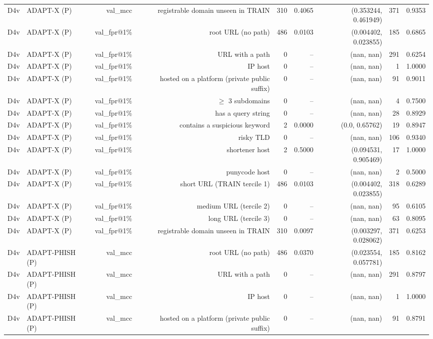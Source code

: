 \begin{table}[t]
\begin{tabular}{llrrrrrrr}
D4v & ADAPT-X (P) & val\_mcc & registrable domain unseen in TRAIN & 310 & 0.4065 & (0.353244, 0.461949) & 371 & 0.9353 \\
D4v & ADAPT-X (P) & val\_fpr@1\% & root URL (no path) & 486 & 0.0103 & (0.004402, 0.023855) & 185 & 0.6865 \\
D4v & ADAPT-X (P) & val\_fpr@1\% & URL with a path & 0 & -- & (nan, nan) & 291 & 0.6254 \\
D4v & ADAPT-X (P) & val\_fpr@1\% & IP host & 0 & -- & (nan, nan) & 1 & 1.0000 \\
D4v & ADAPT-X (P) & val\_fpr@1\% & hosted on a platform (private public suffix) & 0 & -- & (nan, nan) & 91 & 0.9011 \\
D4v & ADAPT-X (P) & val\_fpr@1\% & $\geq$ 3 subdomains & 0 & -- & (nan, nan) & 4 & 0.7500 \\
D4v & ADAPT-X (P) & val\_fpr@1\% & has a query string & 0 & -- & (nan, nan) & 28 & 0.8929 \\
D4v & ADAPT-X (P) & val\_fpr@1\% & contains a suspicious keyword & 2 & 0.0000 & (0.0, 0.65762) & 19 & 0.8947 \\
D4v & ADAPT-X (P) & val\_fpr@1\% & risky TLD & 0 & -- & (nan, nan) & 106 & 0.9340 \\
D4v & ADAPT-X (P) & val\_fpr@1\% & shortener host & 2 & 0.5000 & (0.094531, 0.905469) & 17 & 1.0000 \\
D4v & ADAPT-X (P) & val\_fpr@1\% & punycode host & 0 & -- & (nan, nan) & 2 & 0.5000 \\
D4v & ADAPT-X (P) & val\_fpr@1\% & short URL (TRAIN tercile 1) & 486 & 0.0103 & (0.004402, 0.023855) & 318 & 0.6289 \\
D4v & ADAPT-X (P) & val\_fpr@1\% & medium URL (tercile 2) & 0 & -- & (nan, nan) & 95 & 0.6105 \\
D4v & ADAPT-X (P) & val\_fpr@1\% & long URL (tercile 3) & 0 & -- & (nan, nan) & 63 & 0.8095 \\
D4v & ADAPT-X (P) & val\_fpr@1\% & registrable domain unseen in TRAIN & 310 & 0.0097 & (0.003297, 0.028062) & 371 & 0.6253 \\
D4v & ADAPT-PHISH (P) & val\_mcc & root URL (no path) & 486 & 0.0370 & (0.023554, 0.057781) & 185 & 0.8162 \\
D4v & ADAPT-PHISH (P) & val\_mcc & URL with a path & 0 & -- & (nan, nan) & 291 & 0.8797 \\
D4v & ADAPT-PHISH (P) & val\_mcc & IP host & 0 & -- & (nan, nan) & 1 & 1.0000 \\
D4v & ADAPT-PHISH (P) & val\_mcc & hosted on a platform (private public suffix) & 0 & -- & (nan, nan) & 91 & 0.8791 \\

\end{tabular}
\end{table}

